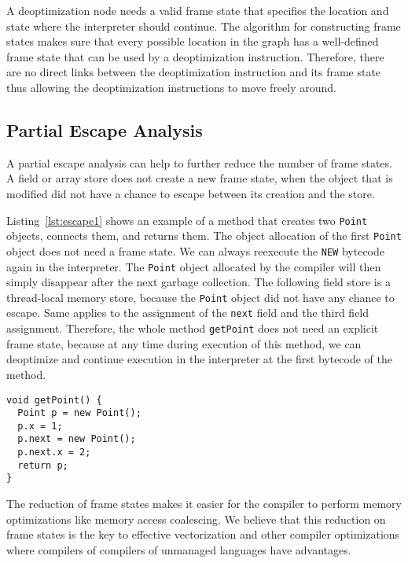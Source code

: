 \documentclass[twocolumn]{svjour3}
\begin{document}
A deoptimization node needs a valid frame state that specifies the location and state where the interpreter should continue.
The algorithm for constructing frame states makes sure that every possible location in the graph has a well-defined frame state that can be used by a deoptimization instruction.
Therefore, there are no direct links between the deoptimization instruction and its frame state thus allowing the deoptimization instructions to move freely around.

\subsection{Partial Escape Analysis}

A partial escape analysis can help to further reduce the number of frame states.
A field or array store does not create a new frame state, when the object that is modified did not have a chance to escape between its creation and the store.

Listing~\ref{lst:escape1} shows an example of a method that creates two \texttt{Point} objects, connects them, and returns them.
The object allocation of the first \texttt{Point} object does not need a frame state.
We can always reexecute the \texttt{NEW} bytecode again in the interpreter.
The \texttt{Point} object allocated by the compiler will then simply disappear after the next garbage collection.
The following field store is a thread-local memory store, because the \texttt{Point} object did not have any chance to escape.
Same applies to the assignment of the \texttt{next} field and the third field assignment.
Therefore, the whole method \texttt{getPoint} does not need an explicit frame state, because at any time during execution of this method, we can deoptimize and continue execution in the interpreter at the first bytecode of the method.

\begin{lstlisting}[label=lst:escape1, caption=Example method that needs no frame state., captionpos=b]
void getPoint() {
  Point p = new Point();
  p.x = 1;
  p.next = new Point();
  p.next.x = 2;
  return p;
}
\end{lstlisting}

The reduction of frame states makes it easier for the compiler to perform memory optimizations like memory access coalescing.
We believe that this reduction on frame states is the key to effective vectorization and other compiler optimizations where compilers of compilers of unmanaged languages have advantages.
\end{document}
